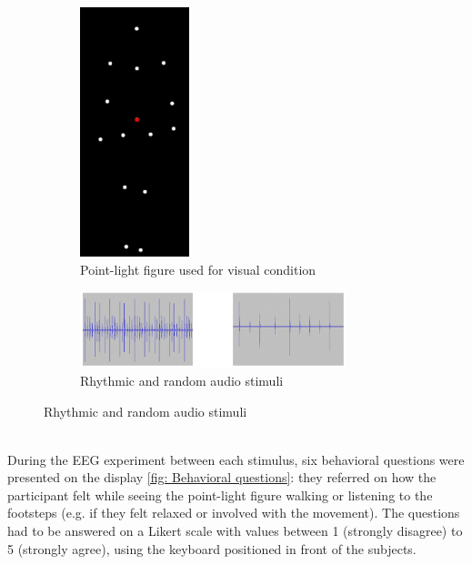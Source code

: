 \begin{figure}[h]
    \centering
    \begin{subfigure}[h]{0.4\textwidth}
        \centering
        \includegraphics[width=0.35\textwidth]{appendix/point_light_figure.png}
        \caption{Point-light figure used for visual condition}
        \label{fig: visual stimuli}
    \end{subfigure}
    \hspace{4em}
    \begin{subfigure}[h]{0.4\textwidth}
        \centering
        \includegraphics[width=0.85\textwidth]{appendix/audio_images.png}
        \caption{Rhythmic and random audio stimuli}
        \label{fig: audio stimuli}
    \end{subfigure}
    \label{fig: stimuli}   
\end{figure} \\
During the EEG experiment between each stimulus, six behavioral questions were presented on the display \ref{fig: Behavioral questions}: they referred on how the participant felt while seeing the point-light figure walking or listening to the footsteps (e.g. if they felt relaxed or involved with the movement). The questions had to be answered on a Likert scale with values between 1 (strongly disagree) to 5 (strongly agree), using the keyboard positioned in front of the subjects. 

